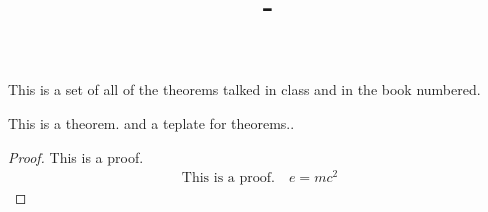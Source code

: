 \documentclass[answers,12pt,addpoints]{exam}
\author{\name}
\title{\course \ - \assignment}
\begin{document}
\maketitle
This is a set of all of the theorems talked in class and in the book numbered.

\newpage
\begin{theorem}
    This is a theorem. and a teplate for theorems..
    \begin{proof}
        This is a proof. \\
        \begin{align*}
            \text{This is a proof.} \quad e=mc^2
        \end{align*}
    \end{proof}
\end{theorem}
\end{document}
